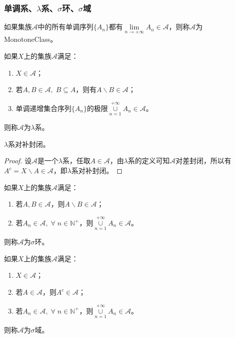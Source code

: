 \subsubsection{单调系、$\lambda$系、$\sigma$环、$\sigma$域}
\begin{definition}
	如果集族$\mathscr{A}$中的所有单调序列$\{A_n\}$都有$\lim\limits_{n\to+\infty}A_n\in\mathscr{A}$，则称$\mathscr{A}$为\gls{MonotoneClass}。
\end{definition}
\begin{definition}
	如果$X$上的集族$\mathscr{A}$满足：
	\begin{enumerate}
		\item $X\in\mathscr{A}$；
		\item 若$A,B\in\mathscr{A},\;B\subseteq A$，则有$A\backslash B\in\mathscr{A}$；
		\item 单调递增集合序列$\{A_n\}$的极限$\underset{n=1}{\overset{+\infty}{\cup}}A_n\in\mathscr{A}$。
	\end{enumerate}
	则称$\mathscr{A}$为$\lambda$系。
\end{definition}
\begin{property}\label{prop:lambda-System}
	$\lambda$系对补封闭。
\end{property}
\begin{proof}
	设$\mathscr{A}$是一个$\lambda$系，任取$A\in \mathscr{A}$，由$\lambda$系的定义可知$\mathscr{A}$对差封闭，所以有$A^c=X\backslash A\in \mathscr{A}$，即$\lambda$系对补封闭。
\end{proof}
\begin{definition}
	如果$X$上的集族$\mathscr{A}$满足：
	\begin{enumerate}
		\item 若$A,B\in\mathscr{A}$，则$A\backslash B\in\mathscr{A}$；
		\item 若$A_n\in\mathscr{A},\;\forall\;n\in\mathbb{N}^+$，则$\underset{n=1}{\overset{+\infty}{\cup}}A_n\in\mathscr{A}$。
	\end{enumerate}
	则称$\mathscr{A}$为$\sigma$环。
\end{definition}
\begin{definition}
	如果$X$上的集族$\mathscr{A}$满足：
	\begin{enumerate}
		\item $X\in\mathscr{A}$；
		\item 若$A\in\mathscr{A}$，则$A^c\in\mathscr{A}$；
		\item 若$A_n\in\mathscr{A},\;\forall\;n\in\mathbb{N}^+$，则$\underset{n=1}{\overset{+\infty}{\cup}}A_n\in\mathscr{A}$。
	\end{enumerate}
	则称$\mathscr{A}$为$\sigma$域。
\end{definition}
